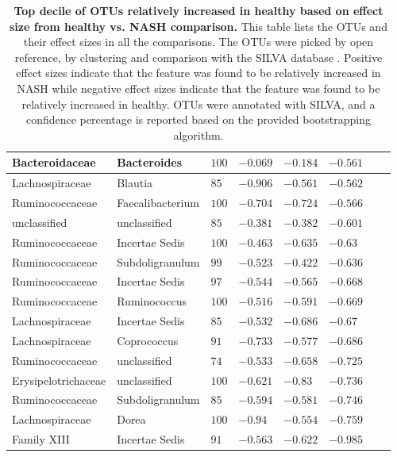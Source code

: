 \begin{table}[!ht]
\begin{tiny}
\begin{tabular}{|l|l|l|l|l|l|l|l|}
Bacteroidaceae & Bacteroides & $100$ & $-0.069$ & $-0.184$ & $-0.561$ \\ \hline
Lachnospiraceae & Blautia & $85$ & $-0.906$ & $-0.561$ & $-0.562$ \\ \hline
Ruminococcaceae & Faecalibacterium & $100$ & $-0.704$ & $-0.724$ & $-0.566$ \\ \hline
unclassified & unclassified & $85$ & $-0.381$ & $-0.382$ & $-0.601$ \\ \hline
Ruminococcaceae & Incertae Sedis & $100$ & $-0.463$ & $-0.635$ & $-0.63$ \\ \hline
Ruminococcaceae & Subdoligranulum & $99$ & $-0.523$ & $-0.422$ & $-0.636$ \\ \hline
Ruminococcaceae & Incertae Sedis & $97$ & $-0.544$ & $-0.565$ & $-0.668$ \\ \hline
Ruminococcaceae & Ruminococcus & $100$ & $-0.516$ & $-0.591$ & $-0.669$ \\ \hline
Lachnospiraceae & Incertae Sedis & $85$ & $-0.532$ & $-0.686$ & $-0.67$ \\ \hline
Lachnospiraceae & Coprococcus & $91$ & $-0.733$ & $-0.577$ & $-0.686$ \\ \hline
Ruminococcaceae & unclassified & $74$ & $-0.533$ & $-0.658$ & $-0.725$ \\ \hline
Erysipelotrichaceae & unclassified & $100$ & $-0.621$ & $-0.83$ & $-0.736$ \\ \hline
Ruminococcaceae & Subdoligranulum & $85$ & $-0.594$ & $-0.581$ & $-0.746$ \\ \hline
Lachnospiraceae & Dorea & $100$ & $-0.94$ & $-0.554$ & $-0.759$ \\ \hline
Family XIII & Incertae Sedis & $91$ & $-0.563$ & $-0.622$ & $-0.985$ \\ \hline
\end{tabular}
\end{tiny}
\caption[Top decile of OTUs relatively increased in healthy based on effect size from healthy vs. NASH comparison.]{ \textbf{Top decile of OTUs relatively increased in healthy based on effect size from healthy vs. NASH comparison.} This table lists the OTUs and their effect sizes in all the comparisons. The OTUs were picked by open reference, by clustering and comparison with the SILVA database \cite{quast2013silva}. Positive effect sizes indicate that the feature was found to be relatively increased in NASH while negative effect sizes indicate that the feature was found to be relatively increased in healthy. OTUs were annotated with SILVA, and a confidence percentage is reported based on the provided bootstrapping algorithm.}
\label{nafld_bot_otu_table}
\end{table}


